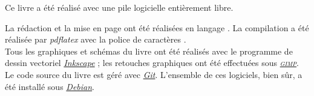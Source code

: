 Ce livre a été réalisé avec une pile logicielle entièrement libre.

La rédaction et la mise en page ont été réalisées en langage . La compilation a été réalisée par \textit{pdflatex} avec la police de caractères .\\
Tous les graphiques et schémas du livre ont été réalisés avec le programme de dessin vectoriel \href{http://inkscape.org/}{\textit{Inkscape}} ; les retouches graphiques ont été effectuées sous \href{http://gimp.org/}{\textit{\textsc{gimp}}}. Le code source du livre est géré avec \href{http://git-scm.com/}{\textit{Git}}. L’ensemble de ces logiciels, bien sûr, a été installé sous \href{http://debian.org/}{\textit{Debian}}.




